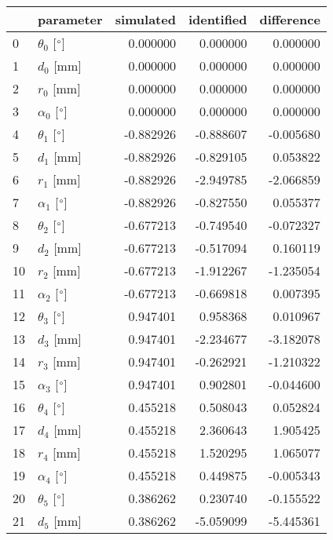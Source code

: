 \documentclass{standalone}%
\begin{document}
%
\normalsize%
\begin{tabular}{llrrr}
\toprule
{} &                 parameter & simulated & identified & difference \\
\midrule
0  &  $\theta_{0}$ [$\degree$] &  0.000000 &   0.000000 &   0.000000 \\
1  &              $d_{0}$ [mm] &  0.000000 &   0.000000 &   0.000000 \\
2  &              $r_{0}$ [mm] &  0.000000 &   0.000000 &   0.000000 \\
3  &  $\alpha_{0}$ [$\degree$] &  0.000000 &   0.000000 &   0.000000 \\
4  &  $\theta_{1}$ [$\degree$] & -0.882926 &  -0.888607 &  -0.005680 \\
5  &              $d_{1}$ [mm] & -0.882926 &  -0.829105 &   0.053822 \\
6  &              $r_{1}$ [mm] & -0.882926 &  -2.949785 &  -2.066859 \\
7  &  $\alpha_{1}$ [$\degree$] & -0.882926 &  -0.827550 &   0.055377 \\
8  &  $\theta_{2}$ [$\degree$] & -0.677213 &  -0.749540 &  -0.072327 \\
9  &              $d_{2}$ [mm] & -0.677213 &  -0.517094 &   0.160119 \\
10 &              $r_{2}$ [mm] & -0.677213 &  -1.912267 &  -1.235054 \\
11 &  $\alpha_{2}$ [$\degree$] & -0.677213 &  -0.669818 &   0.007395 \\
12 &  $\theta_{3}$ [$\degree$] &  0.947401 &   0.958368 &   0.010967 \\
13 &              $d_{3}$ [mm] &  0.947401 &  -2.234677 &  -3.182078 \\
14 &              $r_{3}$ [mm] &  0.947401 &  -0.262921 &  -1.210322 \\
15 &  $\alpha_{3}$ [$\degree$] &  0.947401 &   0.902801 &  -0.044600 \\
16 &  $\theta_{4}$ [$\degree$] &  0.455218 &   0.508043 &   0.052824 \\
17 &              $d_{4}$ [mm] &  0.455218 &   2.360643 &   1.905425 \\
18 &              $r_{4}$ [mm] &  0.455218 &   1.520295 &   1.065077 \\
19 &  $\alpha_{4}$ [$\degree$] &  0.455218 &   0.449875 &  -0.005343 \\
20 &  $\theta_{5}$ [$\degree$] &  0.386262 &   0.230740 &  -0.155522 \\
21 &              $d_{5}$ [mm] &  0.386262 &  -5.059099 &  -5.445361 \\

\end{tabular}
\end{document}
